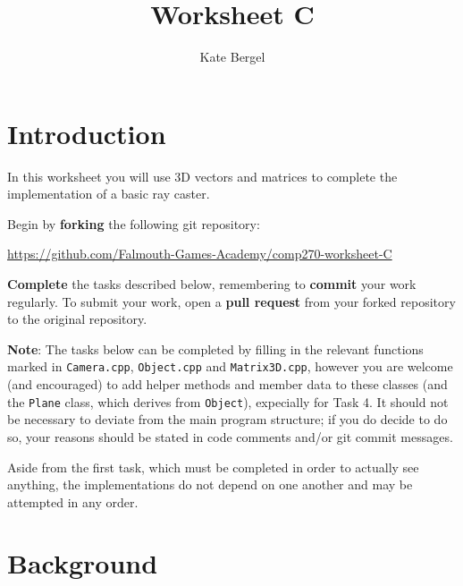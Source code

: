 \documentclass{../../../fal_assignment}
\title{Worksheet C}
\author{Kate Bergel}
\begin{document}
\maketitle

\section*{Introduction}

In this worksheet you will use 3D vectors and matrices to complete the implementation of a basic ray caster.

Begin by \textbf{forking} the following git repository:

\begin{center}
	\url{https://github.com/Falmouth-Games-Academy/comp270-worksheet-C}
\end{center}

\textbf{Complete} the tasks described below, remembering to \textbf{commit} your work regularly.
To submit your work, open a \textbf{pull request} from your forked repository to the original repository.

\textbf{Note}: The tasks below can be completed by filling in the relevant functions marked in \texttt{Camera.cpp}, \texttt{Object.cpp} and \texttt{Matrix3D.cpp}, however you are welcome (and encouraged) to add helper methods and member data to these classes (and the \texttt{Plane} class, which derives from \texttt{Object}), expecially for Task 4. It should not be necessary to deviate from the main program structure; if you do decide to do so, your reasons should be stated in code comments and/or git commit messages.

Aside from the first task, which must be completed in order to actually see anything, the implementations do not depend on one another and may be attempted in any order.

\section*{Background}
\end{document}
